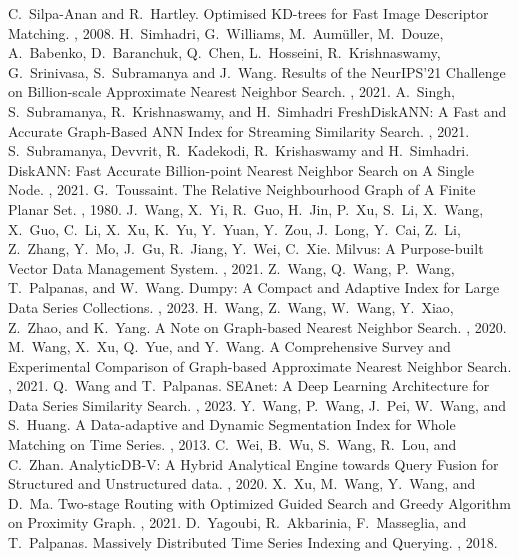 \documentclass[11pt]{article}
\begin{document}
\begin{thebibliography}{10}
\begin{footnotesize}
C.~Silpa-Anan and R.~Hartley. \newblock   Optimised KD-trees for Fast Image Descriptor Matching. , 2008.  
H.~Simhadri, G.~Williams, M.~Aumüller, M.~Douze, A.~Babenko, D.~Baranchuk, Q.~Chen, L.~Hosseini, R.~Krishnaswamy, G.~Srinivasa, S.~Subramanya and J.~Wang. \newblock  Results of the NeurIPS'21 Challenge on Billion-scale Approximate Nearest Neighbor Search. , 2021.
A.~Singh, S.~Subramanya, R.~Krishnaswamy, and H.~Simhadri \newblock FreshDiskANN: A Fast and Accurate Graph-Based ANN Index for Streaming Similarity Search. , 2021.  
S.~Subramanya, Devvrit, R.~Kadekodi, R.~Krishaswamy and H.~Simhadri. \newblock DiskANN: Fast Accurate Billion-point Nearest Neighbor Search on A Single Node. , 2021.
G.~Toussaint. \newblock  The Relative Neighbourhood Graph of A Finite Planar Set. , 1980.  
J.~Wang, X.~Yi, R.~Guo, H.~Jin, P.~Xu, S.~Li, X.~Wang, X.~Guo, C.~Li, X.~Xu, K.~Yu, Y.~Yuan, Y.~Zou, J.~Long, Y.~Cai, Z.~Li, Z.~Zhang, Y.~Mo, J.~Gu, R.~Jiang, Y.~Wei, C.~Xie. \newblock Milvus: A Purpose-built Vector Data Management System. , 2021.
Z.~Wang, Q.~Wang, P.~Wang, T.~Palpanas, and W.~Wang. \newblock Dumpy: A Compact and Adaptive Index for Large Data Series Collections. , 2023.
H.~Wang, Z.~Wang, W.~Wang, Y.~Xiao, Z.~Zhao, and K.~Yang. \newblock A Note on Graph-based Nearest Neighbor Search. , 2020.
M.~Wang, X.~Xu, Q.~Yue, and Y.~Wang. \newblock A Comprehensive Survey and Experimental Comparison of Graph-based Approximate Nearest Neighbor Search. , 2021.
Q.~Wang and T.~Palpanas. \newblock  SEAnet: A Deep Learning Architecture for Data Series Similarity Search. , 2023.
Y.~Wang, P.~Wang, J.~Pei, W.~Wang, and S.~Huang. \newblock A Data-adaptive and Dynamic Segmentation Index for Whole Matching on Time Series. , 2013.
C.~Wei, B.~Wu, S.~Wang, R.~Lou, and C.~Zhan. \newblock  AnalyticDB-V: A Hybrid Analytical Engine towards Query Fusion for Structured and Unstructured data. , 2020.
X.~Xu, M.~Wang, Y.~Wang, and D.~Ma. \newblock Two-stage Routing with Optimized Guided Search and Greedy Algorithm on Proximity Graph. , 2021.
D.~Yagoubi, R.~Akbarinia, F.~Masseglia, and T.~Palpanas. \newblock Massively Distributed Time Series Indexing and Querying. , 2018.

\end{footnotesize}
\end{thebibliography}
\end{document}
